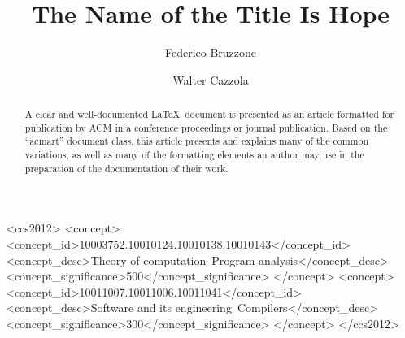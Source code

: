 \documentclass[sigconf,review]{acmart}
\begin{document}
\title{The Name of the Title Is Hope}

\author{Federico Bruzzone}

\author{Walter Cazzola}

\renewcommand{\shortauthors}{Bruzzone and Cazzola}

\begin{abstract}
  A clear and well-documented \LaTeX\ document is presented as an
  article formatted for publication by ACM in a conference proceedings
  or journal publication. Based on the ``acmart'' document class, this
  article presents and explains many of the common variations, as well
  as many of the formatting elements an author may use in the
  preparation of the documentation of their work.
\end{abstract}

\begin{CCSXML}
  <ccs2012>
     <concept>
         <concept_id>10003752.10010124.10010138.10010143</concept_id>
         <concept_desc>Theory of computation~Program analysis</concept_desc>
         <concept_significance>500</concept_significance>
         </concept>
     <concept>
         <concept_id>10011007.10011006.10011041</concept_id>
         <concept_desc>Software and its engineering~Compilers</concept_desc>
         <concept_significance>300</concept_significance>
         </concept>
   </ccs2012>
\end{CCSXML}
\end{document}
